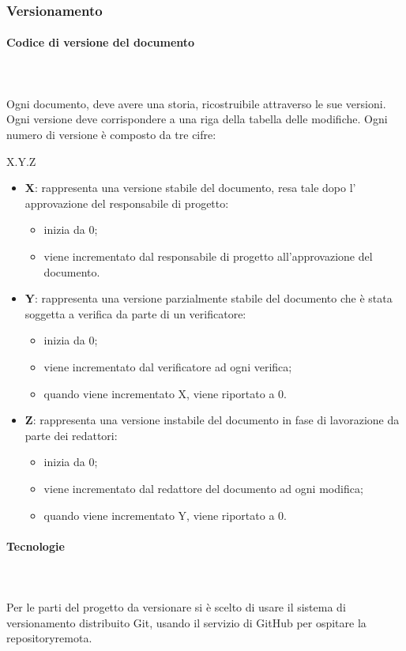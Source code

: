 	\subsubsection{Versionamento}
	\paragraph{Codice di versione del documento} \mbox{}\\ \mbox{}\\
	Ogni documento, deve avere una storia, ricostruibile attraverso le sue versioni. Ogni versione deve corrispondere a una riga della tabella delle modifiche. Ogni numero di versione è composto da tre cifre:
	\begin{center}
		X.Y.Z
	\end{center}
	\begin{itemize}
		\item \textbf{X}: rappresenta una versione stabile del documento, resa tale dopo l' approvazione del responsabile di progetto:
		\begin{itemize}
			\item inizia da 0;
			\item viene incrementato dal responsabile di progetto all'approvazione del documento.
		\end{itemize}
		\item \textbf{Y}: rappresenta una versione parzialmente stabile del documento che è stata soggetta a verifica da parte di un verificatore:
		\begin{itemize}
			\item inizia da 0;
			\item viene incrementato dal verificatore ad ogni verifica;
			\item quando viene incrementato X, viene riportato a 0.
		\end{itemize}
		\item \textbf{Z}: rappresenta una versione instabile del documento in fase di lavorazione da parte dei redattori:
		\begin{itemize}
			\item inizia da 0;
			\item viene incrementato dal redattore del documento ad ogni modifica;
			\item quando viene incrementato Y, viene riportato a 0.
		\end{itemize}			
	\end{itemize}
	\paragraph{Tecnologie} \mbox{}\\ \mbox{}\\
	Per le parti del progetto da versionare si è scelto di usare il sistema di versionamento distribuito Git, usando il servizio di GitHub per ospitare la repository\glosp remota.

